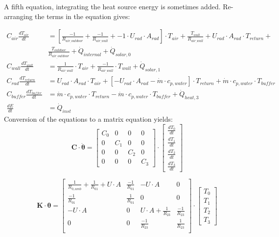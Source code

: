  A fifth equation, integrating the heat source energy is sometimes added. Re-arranging the terms in the equation gives:
 
\begin{equation}
	\begin{aligned}
		C_{air} \frac{dT_{air}}{dt} &= \left[ \frac{-1}{R_{air_{\_}outdoor}} + \frac{-1}{R_{air_{\_}wall}} +  -1 \cdot U_{rad} \cdot A_{rad} \right] \cdot T_{air} + \frac{T_{wall}}{R_{air_{\_}wall}} + U_{rad} \cdot A_{rad} \cdot T_{return} + \\
		 & \frac{T_{outdoor}}{R_{air_{\_}outdoor}}  + \dot{Q}_{internal} + \dot{Q}_{solar, 0} \\
		C_{wall} \frac{dT_{wall}}{dt} &= \frac{1}{R_{air_{\_}wall}} \cdot T_{air} + \frac{-1}{R_{air_{\_}wall}} \cdot T_{wall} + \dot{Q}_{solar, 1} \\
		C_{rad} \frac{dT_{return}}{dt} &=  U_{rad} \cdot A_{rad} \cdot T_{air} + \left[- U_{rad} \cdot A_{rad} -\dot{m} \cdot c_{p, water}\right] \cdot T_{return} + \dot{m} \cdot c_{p, water} \cdot T_{buffer}\\
		C_{buffer} \frac{dT_{buffer}}{dt} &= \dot{m} \cdot c_{p, water} \cdot T_{return} - \dot{m} \cdot c_{p, water} \cdot T_{buffer} + \dot{Q}_{heat, 3} \\
		\frac{dE}{dt} &= \dot{Q}_{inst}
	\end{aligned}
\end{equation}
Conversion of the equations to a matrix equation yields:
\begin{equation}
	\mathbf{C} \cdot \boldsymbol{\dot{\theta}} =
	\begin{bmatrix}
		C_{0} & 0 & 0 & 0\\
		0 &  C_{1} & 0 & 0 \\
		0 & 0 & C_{2} & 0\\
		0 & 0 & 0 & C_{3}
	\end{bmatrix}
	\cdot
	\begin{bmatrix}
		\frac{dT_{0}}{dt} \\
		\frac{dT_{1}}{dt} \\
		\frac{dT_{2}}{dt} \\
		\frac{dT_{3}}{dt} 
	\end{bmatrix}
\end{equation}

\begin{equation}
	\mathbf{K} \cdot \boldsymbol{\theta} =
	\begin{bmatrix}
		\frac{1}{R_{0, amb}} + \frac{1}{R_{01}} + U \cdot A & \frac{-1}{R_{01}} & -U \cdot A & 0 \\
		\frac{-1}{R_{01}} &  \frac{1}{R_{01}}  & 0 & 0 \\
		-U \cdot A & 0 & U \cdot A + \frac{1}{R_{23}}  & \frac{-1}{R_{23}}\\
		0 & 0 & \frac{-1}{R_{23}} &  \frac{1}{R_{23}} \\
	\end{bmatrix}
	\cdot
	\begin{bmatrix}
		T_{0} \\
		T_{1} \\
		T_{2} \\
		T_{3}
	\end{bmatrix}
\end{equation}

